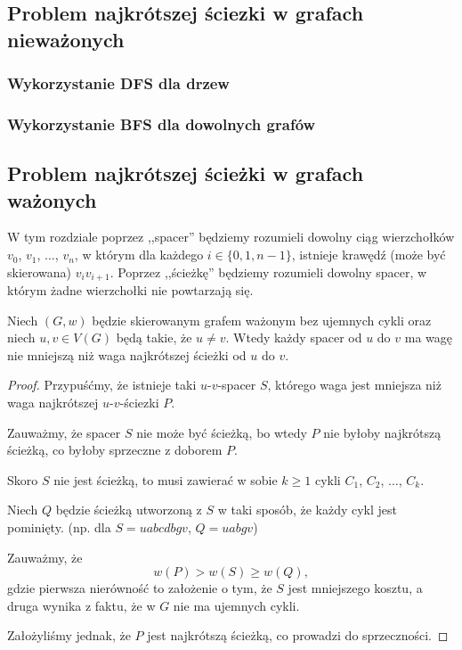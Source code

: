 \subsection{Problem najkrótszej ściezki w grafach nieważonych}
\subsubsection{Wykorzystanie DFS dla drzew}
\subsubsection{Wykorzystanie BFS dla dowolnych grafów}

\subsection{Problem najkrótszej ścieżki w grafach ważonych}

W tym rozdziale poprzez ,,spacer'' będziemy rozumieli dowolny
ciąg wierzchołków $v_0$, $v_1$, $\dots$, $v_{n}$, w 
którym dla każdego $i \in \{0, 1, n-1\}$,
istnieje krawędź (może być skierowana)
$v_iv_{i+1}$. Poprzez ,,ścieżkę''
będziemy rozumieli dowolny spacer, w którym
żadne wierzchołki nie powtarzają się.

\begin{lemma}
	Niech $(G,w)$ będzie skierowanym grafem ważonym 
	bez ujemnych cykli oraz niech $u,v \in V(G)$ będą
	takie, że $u \neq v$. Wtedy
	każdy spacer od $u$ do $v$ ma wagę nie 
	mniejszą niż waga
	najkrótszej ścieżki od $u$ do $v$.
	\begin{proof}
		Przypuśćmy, że istnieje taki $u$-$v$-spacer $S$, 
		którego waga jest mniejsza niż waga najkrótszej
		$u$-$v$-ściezki $P$. 
		
		Zauważmy, że spacer $S$ nie może być ścieżką, 
		bo wtedy $P$ nie byłoby najkrótszą ścieżką, co 
		byłoby sprzeczne z doborem $P$.
		
		Skoro $S$ nie jest ścieżką, to musi zawierać
		w sobie $k\geq 1$ cykli $C_1$, $C_2$, $\dots$, $C_k$. 
		
		Niech $Q$ będzie ścieżką utworzoną z $S$ w taki sposób,
		że każdy cykl jest pominięty. (np. dla $S=uabcdbgv$, 
		$Q=uabgv$)
		
		Zauważmy, że
		\[w(P) > w(S) \geq w(Q),\]
		gdzie pierwsza nierówność to założenie o
		tym, że $S$ jest mniejszego kosztu, a druga wynika
		z faktu, że w $G$ nie ma ujemnych cykli.

		Założyliśmy jednak, że $P$ jest najkrótszą ścieżką,
		co prowadzi do sprzeczności. \qedhere
		
	\end{proof}
	\label{minpath_walk}
\end{lemma}

